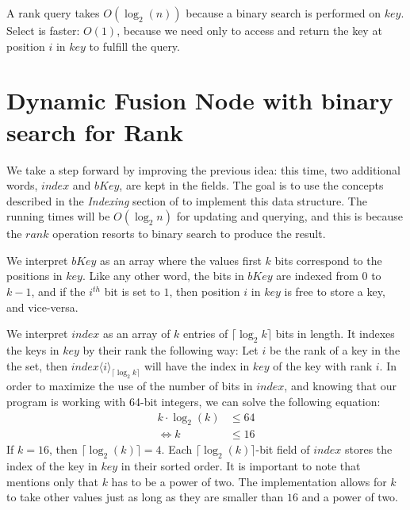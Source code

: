 A rank query takes $O(\log_2(n))$ because a binary search is performed on $key$. Select is faster: $O(1)$, because we need only to access and return the key at position $i$ in $key$ to fulfill the query.

\newpage
\section{Dynamic Fusion Node with binary search for Rank} \label{sec:DynamicFusionNodeBinaryRank}
We take a step forward by improving the previous idea: this time, two additional words, $index$ and $bKey$, are kept in the fields. The goal is to use the concepts described in the \textit{Indexing} section of \cite{patrascu2014dynamic} to implement this data structure. The running times will be $O(\log_2 n)$ for updating and querying, and this is because the $rank$ operation resorts to binary search to produce the result.

We interpret $bKey$ as an array where the values first $k$ bits correspond to the positions in $key$. Like any other word, the bits in $bKey$ are indexed from $0$ to $k-1$, and if the $i^{th}$ bit is set to $1$, then position $i$ in $key$ is free to store a key, and vice-versa.

We interpret $index$ as an array of $k$ entries of $\lceil \log_2 k \rceil$ bits in length. It indexes the keys in $key$ by their rank the following way: Let $i$ be the rank of a key in the the set, then $index\langle i\rangle_{\lceil \log_2 k \rceil}$ will have the index in $key$ of the key with rank $i$. In order to maximize the use of the number of bits in $index$, and knowing that our program is working with 64-bit integers, we can solve the following equation:
\begin{align*}
    k \cdot \log_2(k) &\leq 64 \\
    \iff k &\leq 16
\end{align*}
If $k = 16$, then $\lceil \log_2(k) \rceil = 4$. Each $\lceil \log_2(k) \rceil$-bit field of $index$ stores the index of the key in $key$ in their sorted order.
It is important to note that \cite{patrascu2014dynamic} mentions only that $k$ has to be a power of two. The implementation allows for $k$ to take other values just as long as they are smaller than $16$ and a power of two.

